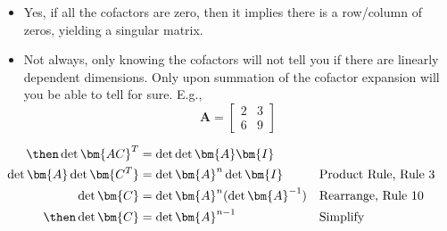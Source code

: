 \begin{itemize}
\begin{enumerate}
    \begin{itemize}\color{foreground}
      \item Yes, if all the cofactors are zero, then it implies there is a
        row/column of zeros, yielding a singular matrix.
      \item Not always, only knowing the cofactors will not tell you if there
        are linearly dependent dimensions. Only upon summation of the cofactor
        expansion will you be able to tell for sure. E.g.,
        \[%
        \bm{A} =
        \begin{bmatrix}
          2 & 3 \\
          6 & 9
        \end{bmatrix}
        \]%
    \end{itemize}

    \begin{align*}
      \then \det{\bm{AC}^T } &= \det{\det{\bm{A}} \bm{I}} \\
      \det{\bm{A}} \det{\bm{C^T }} &= \det{\bm{A}}^n \det{\bm{I}}
      && \text{Product Rule, Rule 3} \\
      \det{\bm{C}}  &=\det{\bm{A}}^n(\det{\bm{A}}^{-1} )
      && \text{Rearrange, Rule 10} \\
      \then \det{\bm{C}} &= \det{\bm{A}}^{n-1} && \text{Simplify} \\
    \end{align*}

  \end{enumerate}

\end{itemize}
